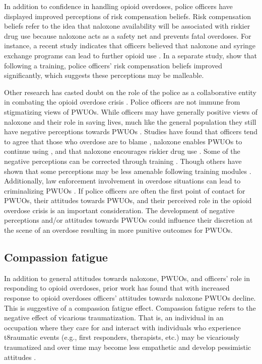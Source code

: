 In addition to confidence in handling opioid overdoses, police officers have displayed improved perceptions of risk compensation beliefs. Risk compensation beliefs refer to the idea that naloxone availability will be associated with riskier drug use because naloxone acts as a safety net and prevents fatal overdoses. For instance, a recent study indicates that officers believed that naloxone and syringe exchange programs can lead to further opioid use \parencite{reichert_police_2023}. In a separate study, \textcite{winograd_concerns_2019} show that following a training, police officers' risk compensation beliefs improved significantly, which suggests these perceptions may be malleable.

Other research has casted doubt on the role of the police as a collaborative entity in combating the opioid overdose crisis \parencite{carroll_police_2023}. Police officers are not immune from stigmatizing views of PWUOs. While officers may have generally positive views of naloxone and their role in saving lives, much like the general population they still have negative perceptions towards PWUOs \parencite{barry_stigma_2014, calabrese_opposition_2019}. Studies have found that officers tend to agree that those who overdose are to blame \parencite{beletsky_attitudes_2005, wagner_training_2016}, naloxone enables PWUOs to continue using \parencite{banta-green_police_2013, burris_stopping_2009, reichert_police_2023}, and that naloxone encourages riskier drug use \parencite{saunders_you_2019}. Some of the negative perceptions can be corrected through training \parencite{winograd_concerns_2019}. Though others have shown that some perceptions may be less amenable following training modules \parencite{wagner_training_2016}. Additionally, law enforcement involvement in overdose situations can lead to criminalizing PWUOs \parencite{lowder_twoyear_2020, van_der_meulen_thats_2021}. If police officers are often the first point of contact for PWUOs, their attitudes towards PWUOs, and their perceived role in the opioid overdose crisis is an important consideration. The development of negative perceptions and/or attitudes towards PWUOs could influence their discretion at the scene of an overdose resulting in more punitive outcomes for PWUOs.

\subsection{Compassion fatigue}

In addition to general attitudes towards naloxone, PWUOs, and officers’ role in responding to opioid overdoses, prior work has found that with increased response to opioid overdoses officers’ attitudes towards naloxone PWUOs decline. This is suggestive of a compassion fatigue effect. Compassion fatigue refers to the negative effect of vicarious traumatization. That is, an individual in an occupation where they care for and interact with individuals who experience t8raumatic events (e.g., first responders, therapists, etc.) may be vicariously traumatized and over time may become less empathetic and develop pessimistic attitudes \parencite{adams_compassion_2006, figley_compassion_1995}.

